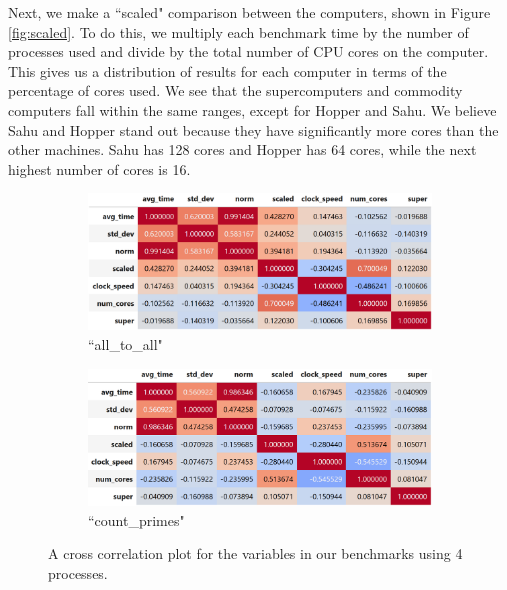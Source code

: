 \documentclass{article}
\begin{document}
Next, we make a ``scaled" comparison between the computers, shown in Figure \ref{fig:scaled}. To do this, we multiply each benchmark time by the number of processes used and divide by the total number of CPU cores on the computer. This gives us a distribution of results for each computer in terms of the percentage of cores used. We see that the supercomputers and commodity computers fall within the same ranges, except for Hopper and Sahu. We believe Sahu and Hopper stand out because they have significantly more cores than the other machines. Sahu has 128 cores and Hopper has 64 cores, while the next highest number of cores is 16.


\begin{figure}[h!]
    \centering
    \begin{subfigure}[b]{0.49\textwidth}
         \centering
         \includegraphics[width=\textwidth]{figures/final/xcorr_all_to_all.png}
         \caption{``all\_to\_all"}
         \label{fig:all_to_all}
     \end{subfigure}
     \hfill
     \begin{subfigure}[b]{0.49\textwidth}
         \centering
         \includegraphics[width=\textwidth]{figures/final/xcorr_count_primes.png}
         \caption{``count\_primes"}
         \label{fig:asdf}
     \end{subfigure}
     \hfill
    \caption{ A cross correlation plot for the variables in our benchmarks using 4 processes. }
    \label{fig:xcorrelation}
\end{figure}
\end{document}
